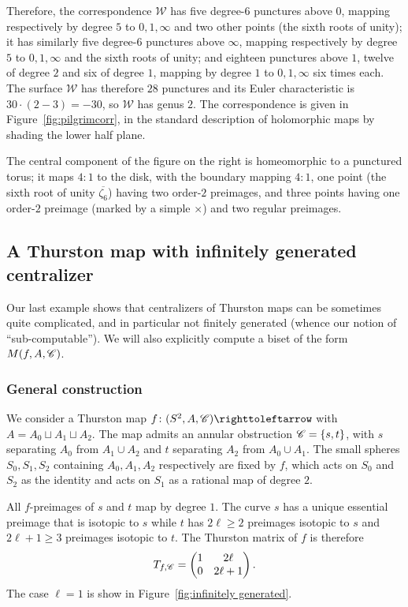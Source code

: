 \documentclass{amsart}
\begin{document}
Therefore, the correspondence $\mathscr W$ has five degree-$6$
punctures above $0$, mapping respectively by degree $5$ to
$0,1,\infty$ and two other points (the sixth roots of unity); it has
similarly five degree-$6$ punctures above $\infty$, mapping
respectively by degree $5$ to $0,1,\infty$ and the sixth roots of
unity; and eighteen punctures above $1$, twelve of degree $2$ and six
of degree $1$, mapping by degree $1$ to $0,1,\infty$ six times
each. The surface $\mathscr W$ has therefore $28$ punctures and its
Euler characteristic is $30\cdot(2-3)=-30$, so $\mathscr W$ has genus
$2$. The correspondence is given in Figure~\ref{fig:pilgrimcorr}, in
the standard description of holomorphic maps by shading the lower half
plane.

The central component of the figure on the right is homeomorphic to a
punctured torus; it maps $4:1$ to the disk, with the boundary mapping
$4:1$, one point (the sixth root of unity $\overline{\zeta_6}$) having
two order-$2$ preimages, and three points having one order-$2$
preimage (marked by a simple $\times$) and two regular preimages.

\subsection{A Thurston map with infinitely generated centralizer}\label{ss:complicated centralizer}
Our last example shows that centralizers of Thurston maps can be
sometimes quite complicated, and in particular not finitely generated
(whence our notion of ``sub-computable''). We will also explicitly
compute a biset of the form $M(f,A,{\mathscr C})$.

\subsubsection{General construction}
We consider a Thurston map $f\colon(S^2,A,\CC)\selfmap$ with
$A=A_0\sqcup A_1\sqcup A_2$. The map admits an annular obstruction
${\mathscr C}=\{s,t\}$, with $s$ separating $A_0$ from $A_1\cup A_2$ and $t$
separating $A_2$ from $A_0\cup A_1$. The small spheres $S_0,S_1,S_2$
containing $A_0,A_1,A_2$ respectively are fixed by $f$, which acts on
$S_0$ and $S_2$ as the identity and acts on $S_1$ as a rational map of
degree $2$.

All $f$-preimages of $s$ and $t$ map by degree $1$. The curve $s$ has
a unique essential preimage that is isotopic to $s$ while $t$ has
$2\ell\ge 2$ preimages isotopic to $s$ and $2\ell+1\ge 3$ preimages
isotopic to $t$. The Thurston matrix of $f$ is therefore
\[T_{f,{\mathscr C}}=\begin{pmatrix}1 & 2\ell\\ 0 & 2\ell+1\end{pmatrix}.
\]
The case $\ell=1$ is show in Figure~\ref{fig:infinitely generated}.
  
\end{document}

